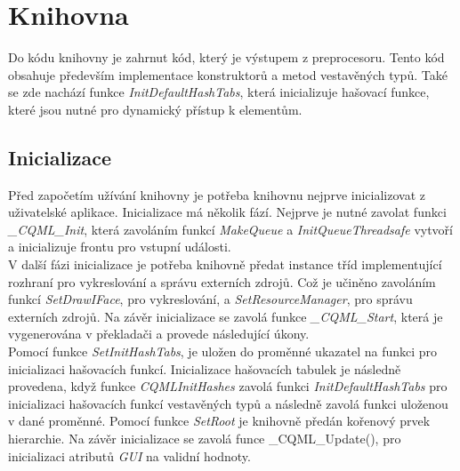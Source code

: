 \documentclass[11pt,twoside,a4paper]{book}
\begin{document}
\section{\label{SEC:aa}Knihovna}
Do kódu knihovny je zahrnut kód, který je výstupem z preprocesoru. Tento kód obsahuje především implementace konstruktorů a metod vestavěných typů. Také se zde nachází funkce \textit{InitDefaultHashTabs}, která inicializuje hašovací funkce, které jsou nutné pro dynamický přístup k elementům.

\subsection{Inicializace}
Před započetím užívání knihovny je potřeba knihovnu nejprve inicializovat z uživatelské aplikace. Inicializace má několik fází. Nejprve je nutné zavolat funkci \textit{\_CQML\_Init}, která zavoláním funkcí \textit{MakeQueue} a \textit{InitQueueThreadsafe} vytvoří a inicializuje frontu pro vstupní události.\\
V další fázi inicializace je potřeba knihovně předat instance tříd implementující rozhraní pro vykreslování a správu externích zdrojů. Což je učiněno zavoláním funkcí \textit{SetDrawIFace}, pro vykreslování, a \textit{SetResourceManager}, pro správu externích zdrojů. Na závěr inicializace se zavolá funkce \textit{\_CQML\_Start}, která je vygenerována v překladači a provede následující úkony.\\
Pomocí funkce \textit{SetInitHashTabs}, je uložen do proměnné ukazatel na funkci pro inicializaci hašovacích funkcí. Inicializace hašovacích tabulek je následně provedena, když funkce \textit{CQMLInitHashes} zavolá funkci \textit{InitDefaultHashTabs} pro inicializaci hašovacích funkcí vestavěných typů a následně zavolá funkci uloženou v dané proměnné. Pomocí funkce \textit{SetRoot} je knihovně předán kořenový prvek hierarchie. Na závěr inicializace se zavolá funce \_CQML\_Update(), pro inicializaci atributů \textit{GUI} na validní hodnoty.	
\end{document}
